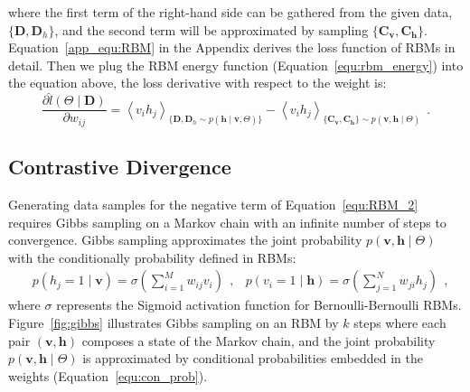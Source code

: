 where the first term of the right-hand side can be gathered from the given data, $ \{\mathbf{D}, \mathbf{D}_h\}$, and the second term will be approximated by sampling $ \{\mathbf{C_v}, \mathbf{C_h}\} $.
Equation~\ref{app_equ:RBM} in the Appendix derives the loss function of RBMs in detail.
Then we plug the RBM energy function (Equation~\ref{equ:rbm_energy}) into the equation above, the loss derivative with respect to the weight is:
\begin{equation}
\label{equ:RBM_2}
\dfrac{\partial \hat{l} (\Theta \mid \mathbf{D})}{\partial w_{ij}} 
= \left \langle v_i h_j \right \rangle_{\{\mathbf{D}, \mathbf{D}_h \sim p( \mathbf{h} \mid \mathbf{v}, \Theta) \}}
- \left \langle  v_i h_j \right \rangle_{\{\mathbf{C_v}, \mathbf{C_h}\} \sim p( \mathbf{v}, \mathbf{h} \mid  \Theta)}~~. %
\end{equation}
\subsection{Contrastive Divergence}
\label{sec:cd}
Generating data samples for the negative term of Equation~\ref{equ:RBM_2} requires Gibbs sampling on a Markov chain with an infinite number of steps to convergence.
Gibbs sampling approximates the joint probability $p( \mathbf{v}, \mathbf{h} \mid  \Theta)$ with the conditionally probability defined in RBMs:
\begin{equation}
\begin{aligned}
& p(h_j = 1 \mid \mathbf{v}) = \sigma(\sum_{i=1}^{M} w_{ij} v_i)~~,
& p(v_i = 1 \mid \mathbf{h}) = \sigma(\sum_{j=1}^{N} w_{ji} h_j)~~,
\end{aligned}
\label{equ:con_prob}
\end{equation} 
where $\sigma$ represents the Sigmoid activation function for Bernoulli-Bernoulli RBMs.
Figure~\ref{fig:gibbs} illustrates Gibbs sampling on an RBM by $k$ steps where each pair $(\mathbf{v}, \mathbf{h})$ composes a state of the Markov chain, and the joint probability $p( \mathbf{v}, \mathbf{h} \mid  \Theta)$ is approximated by conditional probabilities embedded in the weights (Equation~\ref{equ:con_prob}).

